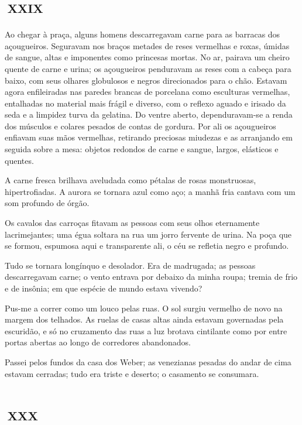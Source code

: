 \chapter*{\small{}\,\Large\centering\textsc{xxix}\,\small{}}

Ao chegar à praça, alguns homens descarregavam carne para as barracas dos açougueiros. Seguravam nos braços metades de reses vermelhas e roxas, úmidas de sangue, altas e imponentes como princesas mortas. No ar, pairava um cheiro quente de carne e urina; os açougueiros penduravam as reses com a cabeça para baixo, com seus olhares globulosos e negros direcionados para o chão. Estavam agora enfileiradas nas paredes brancas de porcelana como esculturas vermelhas, entalhadas no material mais frágil e diverso, com o reflexo aguado e irisado da seda e a limpidez turva da gelatina. Do ventre aberto, dependuravam-se a renda dos músculos e colares pesados de contas de gordura. Por ali os açougueiros enfiavam suas mãos vermelhas, retirando preciosas miudezas e as arranjando em seguida sobre a mesa: objetos redondos de carne e sangue, largos, elásticos e quentes.

A carne fresca brilhava aveludada como pétalas de rosas monstruosas, hipertrofiadas. A aurora se tornara azul como aço; a manhã fria cantava com um som profundo de órgão.

Os cavalos das carroças fitavam as pessoas com seus olhos eternamente lacrimejantes; uma égua soltara na rua um jorro fervente de urina. Na poça que se formou, espumosa aqui e transparente ali, o céu se refletia negro e profundo.

Tudo se tornara longínquo e desolador. Era de madrugada; as pessoas descarregavam carne; o vento entrava por debaixo da minha roupa; tremia de frio e de insônia; em que espécie de mundo estava vivendo? 

Pus-me a correr como um louco pelas ruas. O sol surgiu vermelho de novo na margem dos telhados. As ruelas de casas altas ainda estavam governadas pela escuridão, e só no cruzamento das ruas a luz brotava cintilante como por entre portas abertas ao longo de corredores abandonados.

Passei pelos fundos da casa dos Weber; as venezianas pesadas do andar de cima estavam cerradas; tudo era triste e deserto; o casamento se consumara.


\chapter*{\small{}\,\Large\centering\textsc{xxx}\,\small{}}


